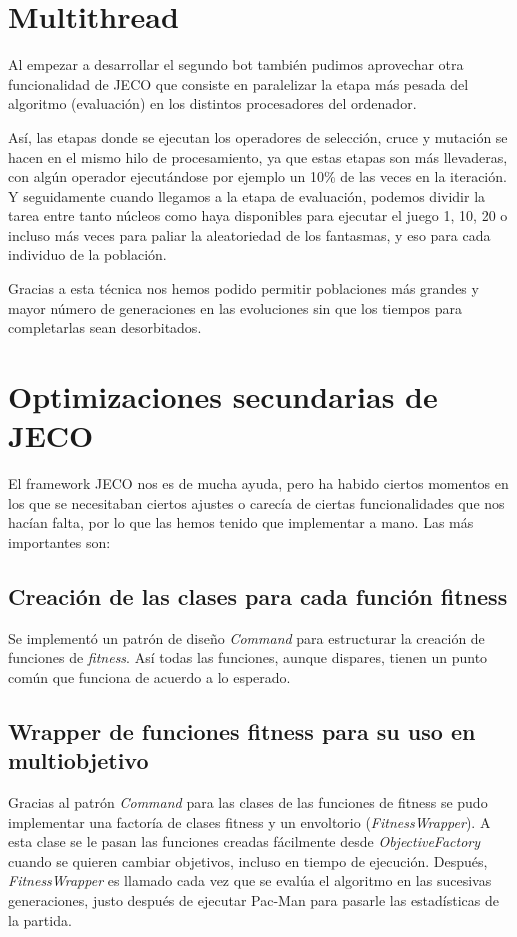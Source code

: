 \section{Multithread}
Al empezar a desarrollar el segundo bot también pudimos aprovechar otra funcionalidad de JECO que consiste en paralelizar la etapa más pesada del algoritmo (evaluación) en los distintos procesadores del ordenador.

Así, las etapas donde se ejecutan los operadores de selección, cruce y mutación se hacen en el mismo hilo de procesamiento, ya que estas etapas son más llevaderas, con algún operador ejecutándose por ejemplo un 10\% de las veces en la iteración. Y seguidamente cuando llegamos a la etapa de evaluación, podemos dividir la tarea entre tanto núcleos como haya disponibles para ejecutar el juego 1, 10, 20 o incluso más veces para paliar la aleatoriedad de los fantasmas, y eso para cada individuo de la población.

Gracias a esta técnica nos hemos podido permitir poblaciones más grandes y mayor número de generaciones en las evoluciones sin que los tiempos para completarlas sean desorbitados.


\section{Optimizaciones secundarias de JECO}
El framework JECO nos es de mucha ayuda, pero ha habido ciertos momentos en los que se necesitaban ciertos ajustes o carecía de ciertas funcionalidades que nos hacían falta, por lo que las hemos tenido que implementar a mano. Las más importantes son:

\subsection{Creación de las clases para cada función fitness}
Se implementó un patrón de diseño \textit{Command} para estructurar la creación de funciones de \textit{fitness}. Así todas las funciones, aunque dispares, tienen un punto común que funciona de acuerdo a lo esperado.

\subsection{Wrapper de funciones fitness para su uso en multiobjetivo} \label{sec:multi}
Gracias al patrón \textit{Command} para las clases de las funciones de fitness se pudo implementar una factoría de clases fitness y un envoltorio (\textit{FitnessWrapper}). A esta clase se le pasan las funciones creadas fácilmente desde \textit{ObjectiveFactory} cuando se quieren cambiar objetivos, incluso en tiempo de ejecución. Después, \textit{FitnessWrapper} es llamado cada vez que se evalúa el algoritmo en las sucesivas generaciones, justo después de ejecutar Pac-Man para pasarle las estadísticas de la partida.

